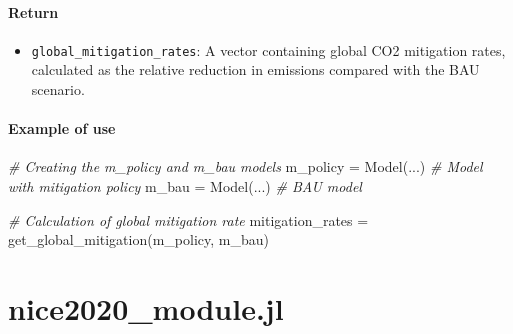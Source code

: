 \documentclass[
]{article}
\newenvironment{Shaded}{}{}
\newcommand{\CommentTok}[1]{\textcolor[rgb]{0.38,0.63,0.69}{\textit{#1}}}
\newcommand{\FunctionTok}[1]{\textcolor[rgb]{0.02,0.16,0.49}{#1}}
\newcommand{\NormalTok}[1]{#1}
\newcommand{\OperatorTok}[1]{\textcolor[rgb]{0.40,0.40,0.40}{#1}}
\providecommand{\tightlist}{%
  \setlength{\itemsep}{0pt}\setlength{\parskip}{0pt}}
\begin{document}
\paragraph{Return}\label{return-3}

\begin{itemize}
\tightlist
\item
  \texttt{global\_mitigation\_rates}: A vector containing global CO2
  mitigation rates, calculated as the relative reduction in emissions
  compared with the BAU scenario.
\end{itemize}

\paragraph{Example of use}\label{example-of-use-1}

\begin{Shaded}
\begin{Highlighting}[]
\CommentTok{\# Creating the m\_policy and m\_bau models}
\NormalTok{m\_policy }\OperatorTok{=} \FunctionTok{Model}\NormalTok{(}\OperatorTok{...}\NormalTok{) }\CommentTok{\# Model with mitigation policy}
\NormalTok{m\_bau }\OperatorTok{=} \FunctionTok{Model}\NormalTok{(}\OperatorTok{...}\NormalTok{) }\CommentTok{\# BAU model}

\CommentTok{\# Calculation of global mitigation rate}
\NormalTok{mitigation\_rates }\OperatorTok{=} \FunctionTok{get\_global\_mitigation}\NormalTok{(m\_policy, m\_bau)}
\end{Highlighting}
\end{Shaded}

%
%

\section{nice2020\_module.jl}\label{nice_v2_module.jl}
\end{document}
